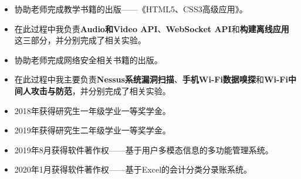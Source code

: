 \documentclass[10pt,a4paper]{altacv}
\begin{document}
\divider



\begin{itemize}
	\item 协助老师完成教学书籍的出版——《HTML5、CSS3高级应用》。
	\item 在此过程中我负责\textbf{Audio和Video API}、\textbf{WebSocket API}和\textbf{构建离线应用}这三部分，并分别完成了相关实验。
\end{itemize}

\divider

\begin{itemize}
	\item 协助老师完成网络安全相关书籍的出版。
	\item 在此过程中我主要负责\textbf{Nessus系统漏洞扫描}、\textbf{手机Wi-Fi数据嗅探}和\textbf{Wi-Fi中间人攻击与防范}，并分别完成了相关实验。
\end{itemize}


\begin{itemize}

	\item 2018年获得研究生一年级学业一等奖学金。
	\item 2019年获得研究生二年级学业一等奖学金。
	\item 2019年8月获得软件著作权——基于用户多模态信息的多功能管理系统。
	\item 2020年1月获得软件著作权——基于Excel的会计分类分录账系统。
\end{itemize}

\nocite{*}

\printbibliography[heading=pubtype,title={\printinfo{\faBook}{Dissertations}},type=book]
\end{document}
